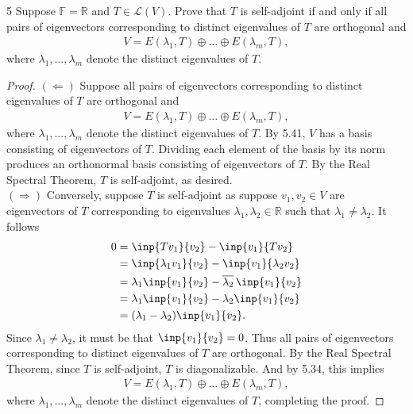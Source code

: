 \documentclass{extarticle}
\newenvironment{problem}[1]{\begin{prob*}{#1}{}}{\end{prob*}}
\newcommand{\R}{\mathbb{R}}
\newcommand{\F}{\mathbb{F}}
\newcommand{\Hom}{\mathcal{L}}
\newcommand\widebar[1]{\mathop{\overline{#1}}}
\begin{document}
\begin{problem}{5}
Suppose $\F=\R$ and $T\in\Hom(V)$.  Prove that $T$ is self-adjoint if and only if all pairs of eigenvectors corresponding to distinct eigenvalues of $T$ are orthogonal and 
\begin{align*}
V = E(\lambda_1, T)\oplus \dots \oplus E(\lambda_m, T),
\end{align*}
where $\lambda_1,\dots,\lambda_m$ denote the distinct eigenvalues of $T$.
\end{problem}
\begin{proof}
$(\Leftarrow)$ Suppose all pairs of eigenvectors corresponding to distinct eigenvalues of $T$ are orthogonal and 
\begin{align*}
V = E(\lambda_1, T)\oplus \dots \oplus E(\lambda_m, T),
\end{align*}
where $\lambda_1,\dots,\lambda_m$ denote the distinct eigenvalues of $T$.  By 5.41, $V$ has a basis consisting of eigenvectors of $T$.  Dividing each element of the basis by its norm produces an orthonormal basis consisting of eigenvectors of $T$.  By the Real Spectral Theorem, $T$ is self-adjoint, as desired.\\
\indent $(\Rightarrow)$ Conversely, suppose $T$ is self-adjoint as suppose $v_1,v_2\in V$ are eigenvectors of $T$ corresponding to eigenvalues $\lambda_1,\lambda_2\in\R$ such that $\lambda_1\neq\lambda_2$.  It follows
\begin{align*}
0 &= \inp{Tv_1}{v_2} - \inp{v_1}{Tv_2}\\
&= \inp{\lambda_1 v_1}{v_2} - \inp{v_1}{\lambda_2 v_2}\\
&= \lambda_1\inp{v_1}{v_2} - \widebar{\lambda_2}\inp{v_1}{v_2}\\
&= \lambda_1\inp{v_1}{v_2} - \lambda_2\inp{v_1}{v_2}\\
&= (\lambda_1 - \lambda_2)\inp{v_1}{v_2}.
\end{align*}
Since $\lambda_1\neq \lambda_2$, it must be that $\inp{v_1}{v_2}=0$.  Thus all pairs of eigenvectors corresponding to distinct eigenvalues of $T$ are orthogonal.  By the Real Spectral Theorem, since $T$ is self-adjoint, $T$ is diagonalizable.  And by 5.34, this implies
\begin{align*}
V = E(\lambda_1, T)\oplus \dots \oplus E(\lambda_m, T),
\end{align*}
where $\lambda_1,\dots,\lambda_m$ denote the distinct eigenvalues of $T$, completing the proof.
\end{proof}
\end{document}
